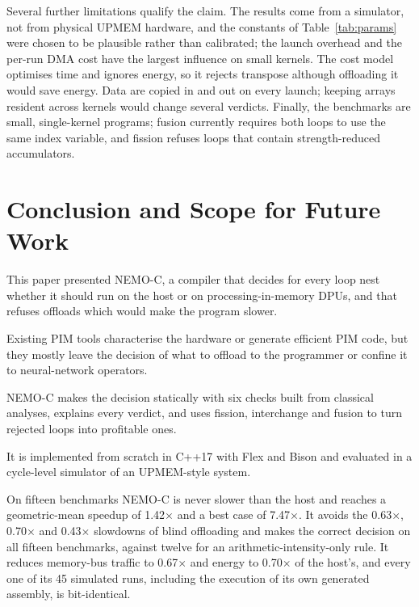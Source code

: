 \documentclass{ieeeaccess}
\begin{document}
Several further limitations qualify the claim. The results come from a simulator, not from physical UPMEM hardware, and the constants of Table~\ref{tab:params} were chosen to be plausible rather than calibrated; the launch overhead and the per-run DMA cost have the largest influence on small kernels. The cost model optimises time and ignores energy, so it rejects transpose although offloading it would save energy. Data are copied in and out on every launch; keeping arrays resident across kernels would change several verdicts. Finally, the benchmarks are small, single-kernel programs; fusion currently requires both loops to use the same index variable, and fission refuses loops that contain strength-reduced accumulators.

\section{Conclusion and Scope for Future Work}
\label{sec:conclusion}

This paper presented NEMO-C, a compiler that decides for every loop nest whether it should run on the host or on processing-in-memory DPUs, and that refuses offloads which would make the program slower.

Existing PIM tools characterise the hardware or generate efficient PIM code, but they mostly leave the decision of what to offload to the programmer or confine it to neural-network operators.

NEMO-C makes the decision statically with six checks built from classical analyses, explains every verdict, and uses fission, interchange and fusion to turn rejected loops into profitable ones.

It is implemented from scratch in C++17 with Flex and Bison and evaluated in a cycle-level simulator of an UPMEM-style system.

On fifteen benchmarks NEMO-C is never slower than the host and reaches a geometric-mean speedup of 1.42$\times$ and a best case of 7.47$\times$. It avoids the 0.63$\times$, 0.70$\times$ and 0.43$\times$ slowdowns of blind offloading and makes the correct decision on all fifteen benchmarks, against twelve for an arithmetic-intensity-only rule. It reduces memory-bus traffic to 0.67$\times$ and energy to 0.70$\times$ of the host's, and every one of its 45 simulated runs, including the execution of its own generated assembly, is bit-identical.
\end{document}
